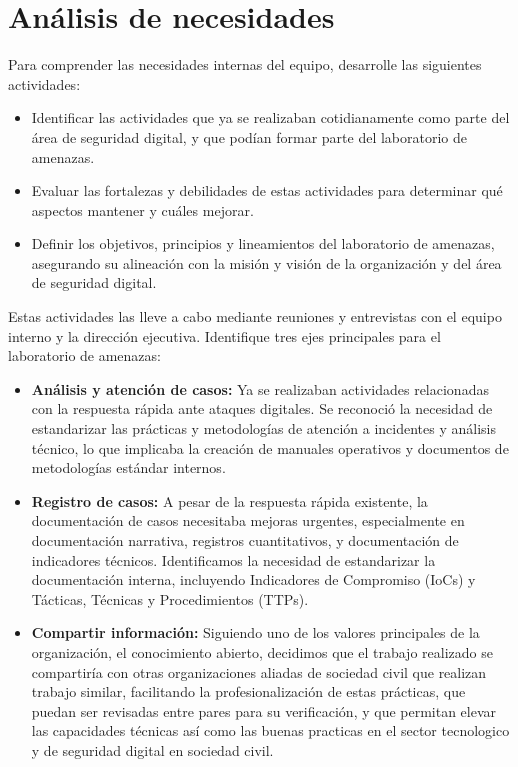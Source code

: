 \documentclass[12pt]{caltech_thesis}
\begin{document}
\section{Análisis de necesidades}

Para comprender las necesidades internas del equipo, desarrolle las siguientes actividades:

\begin{itemize}
    \item Identificar las actividades que ya se realizaban cotidianamente como parte del área de seguridad digital, y que podían formar parte del laboratorio de amenazas.
    \item Evaluar las fortalezas y debilidades de estas actividades para determinar qué aspectos mantener y cuáles mejorar.
    \item Definir los objetivos, principios y lineamientos del laboratorio de amenazas, asegurando su alineación con la misión y visión de la organización y del área de seguridad digital.
\end{itemize}

Estas actividades las lleve a cabo mediante reuniones y entrevistas con el equipo interno y la dirección ejecutiva. Identifique tres ejes principales para el laboratorio de amenazas:

\begin{itemize}
    \item \textbf{Análisis y atención de casos:} Ya se realizaban actividades relacionadas con la respuesta rápida ante ataques digitales. Se reconoció la necesidad de estandarizar las prácticas y metodologías de atención a incidentes y análisis técnico, lo que implicaba la creación de manuales operativos y documentos de metodologías estándar internos.
    \item \textbf{Registro de casos:} A pesar de la respuesta rápida existente, la documentación de casos necesitaba mejoras urgentes, especialmente en documentación narrativa, registros cuantitativos, y documentación de indicadores técnicos. Identificamos la necesidad de estandarizar la documentación interna, incluyendo Indicadores de Compromiso (IoCs) y Tácticas, Técnicas y Procedimientos (TTPs).
    \item \textbf{Compartir información:} Siguiendo uno de los valores principales de la organización, el conocimiento abierto, decidimos que el trabajo realizado se compartiría con otras organizaciones aliadas de sociedad civil que realizan trabajo similar, facilitando la profesionalización de estas prácticas, que puedan ser revisadas entre pares para su verificación, y que permitan elevar las capacidades técnicas así como las buenas practicas en el sector tecnologico y de seguridad digital en sociedad civil.
\end{itemize}
\end{document}
